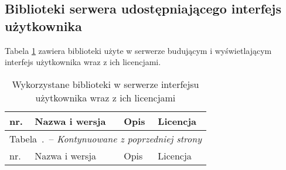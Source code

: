 \documentclass[a4paper,11pt,twoside]{report}
\renewcommand{\tablename}{Tabela}
\renewcommand*{\thetable}{\arabic{chapter}.\arabic{table}}
\theoremstyle{definition}
\begin{document}
        \subsection{Biblioteki serwera udostępniającego interfejs użytkownika}
        Tabela \ref{biblioteki-frontend} zawiera biblioteki użyte w serwerze budującym i wyświetlającym interfejs użytkownika wraz z ich licencjami.
        
        \begin{center}
        	\begin{longtable}{| p{} | p{} | p{} | p{} |}
        		\caption{Wykorzystane biblioteki w serwerze interfejsu użytkownika wraz z ich licencjami}
        		\label{biblioteki-frontend} \\
        		\hline
        		nr. & Nazwa i wersja & Opis & Licencja \\ \hline
        		\endfirsthead
        		\multicolumn{4}{c}{\tablename\ \thetable\ -- \textit{Kontynuowane z poprzedniej strony}} \\
        		\hline
        		nr. & Nazwa i wersja & Opis & Licencja \\ \hline
        		\endhead
        		

\end{longtable}
\end{center}
\end{document}
